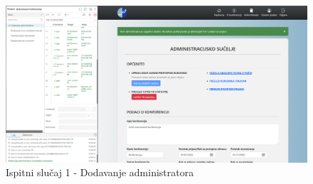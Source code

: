 			  \begin{figure}[H]
			 	\includegraphics[width= 15 cm, height= 25 cm, keepaspectratio]{slike/test_dodavanje_administratora.png} 
			 	\centering
			 	\caption{Ispitni slučaj 1 - Dodavanje administratora}
			 	\label{fig:act5}
			 \end{figure}
			
